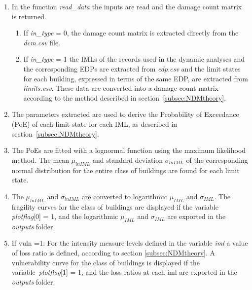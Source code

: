 \begin{enumerate}
\item In the function \textit{read\_data} the inputs are read and the damage count matrix is returned.
\begin{enumerate}
\item If \textit{in\_type} = 0, the damage count matrix is extracted directly from the \textit{dcm.csv} file.

\item If \textit{in\_type} = 1 the IMLs of the records used in the dynamic analyses and the corresponding EDPs are extracted from \textit{edp.csv} and the limit states for each building, expressed in terms of the same EDP, are extracted from \textit{limits.csv}.	 These data are converted into a damage count matrix according to the method described in section~\ref{subsec:NDMtheory}.
\end{enumerate}

\item The parameters extracted are used to derive the Probability of Exceedance (PoE) of each limit state for each IML, as described in section~\ref{subsec:NDMtheory}.

\item The PoEs are fitted with a lognormal function using the maximum likelihood method. The mean $\mu_{ln IML}$ and standard deviation $\sigma_{ln IML}$ of the corresponding normal distribution for the entire class of buildings are found for each limit state.

\item The $\mu_{ln IML}$ and $\sigma_{ln IML}$ are converted to logarithmic $\mu_{IML}$ and $\sigma_{IML}$. The fragility curves for the class of buildings are displayed if the variable \textit{plotflag}[0] = 1, and the logarithmic $\mu_{IML}$ and $\sigma_{IML}$ are exported in the \textit{outputs} folder.

\item If vuln =1:  For the intensity measure levels defined in the variable \textit{iml} a value of loss ratio is defined, according to section \ref{subsec:NDMtheory}. A vulnerability curve for the class of buildings is displayed if the variable~\textit{plotflag}[1] = 1, and the loss ratios at each iml are exported in the \textit{outputs} folder.

\end{enumerate}